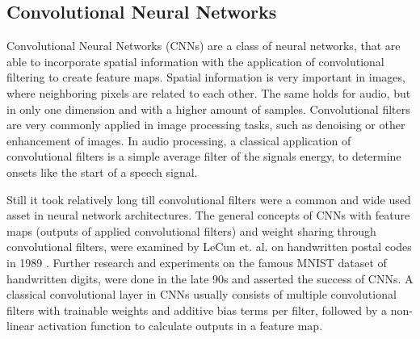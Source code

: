 
\subsection{Convolutional Neural Networks}\label{sec:prev_nn_cnn}
Convolutional Neural Networks (CNNs) are a class of neural networks, that are able to incorporate spatial information with the application of convolutional filtering to create feature maps.
Spatial information is very important in images, where neighboring pixels are related to each other.
The same holds for audio, but in only one dimension and with a higher amount of samples.
Convolutional filters are very commonly applied in image processing tasks, such as denoising or other enhancement of images.
In audio processing, a classical application of convolutional filters is a simple average filter of the signals energy, to determine onsets like the start of a speech signal.

Still it took relatively long till convolutional filters were a common and wide used asset in neural network architectures.
The general concepts of CNNs with feature maps (outputs of applied convolutional filters) and weight sharing through convolutional filters, were examined by LeCun et. al. on handwritten postal codes in 1989 \cite{LeCun1989_Generalization}.
Further research and experiments on the famous MNIST dataset of handwritten digits, were done in the late 90s \cite{LeCun1998} and asserted the success of CNNs.
A classical convolutional layer in CNNs usually consists of multiple convolutional filters with trainable weights and additive bias terms per filter, followed by a non-linear activation function to calculate outputs in a feature map.



  
